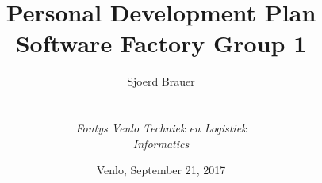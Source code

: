 
\def\Company{\textit{FSG1 - Fontys SoFa Group 1}}
\def\Institute{\textit{Fontys Venlo Techniek en Logistiek}}
\def\Course{\textit{Informatics}}

\def\BoldTitle{Personal Development Plan}
\def\Subtitle{Software Factory Group 1}
\def\Authors{Sjoerd Brauer}


\title{\textbf{\BoldTitle}\\\Subtitle}
\author{\Authors \\ \\ \\ \Institute\\ \Course}
\date{Venlo, September 21, 2017}
